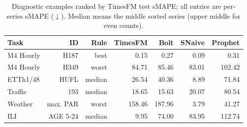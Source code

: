 \begin{table}[!htbp]
\centering
\caption{Diagnostic examples ranked by TimesFM test sMAPE; all entries are per-series sMAPE ($\downarrow$). Median means the middle sorted series (upper middle for even counts).}
\label{tab:selections}
\small
\setlength{\tabcolsep}{3.5pt}
\begin{tabular}{lrrrrrr}
\hline
Task & ID & Rule & TimesFM & Bolt & SNaive & Prophet \\
\hline
M4 Hourly & H187 & best & 0.15 & 0.27 & 0.09 & 0.31 \\
M4 Hourly & H349 & worst & 84.71 & 85.46 & 83.01 & 102.42 \\
ETTh1/48 & HUFL & median & 26.54 & 40.36 & 8.89 & 71.84 \\
Traffic & 193 & median & 18.65 & 15.63 & 20.07 & 80.54 \\
Weather & max. PAR & worst & 158.46 & 187.96 & 3.79 & 41.27 \\
ILI & AGE 5-24 & median & 9.95 & 74.00 & 83.95 & 112.74 \\
\hline
\end{tabular}
\end{table}
